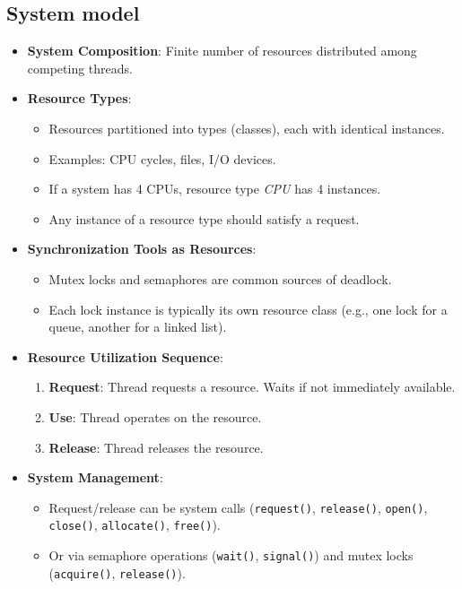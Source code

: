 \subsection{System model}
\begin{itemize}
    \item \textbf{System Composition}: Finite number of resources distributed among competing threads.
    \item \textbf{Resource Types}:
    \begin{itemize}
        \item Resources partitioned into types (classes), each with identical instances.
        \item Examples: CPU cycles, files, I/O devices.
        \item If a system has 4 CPUs, resource type \textit{CPU} has 4 instances.
        \item Any instance of a resource type should satisfy a request.
    \end{itemize}
    \item \textbf{Synchronization Tools as Resources}:
    \begin{itemize}
        \item Mutex locks and semaphores are common sources of deadlock.
        \item Each lock instance is typically its own resource class (e.g., one lock for a queue, another for a linked list).
    \end{itemize}
    \item \textbf{Resource Utilization Sequence}:
    \begin{enumerate}
        \item \textbf{Request}: Thread requests a resource. Waits if not immediately available.
        \item \textbf{Use}: Thread operates on the resource.
        \item \textbf{Release}: Thread releases the resource.
    \end{enumerate}
    \item \textbf{System Management}:
    \begin{itemize}
        \item Request/release can be system calls (\texttt{request()}, \texttt{release()}, \texttt{open()}, \texttt{close()}, \texttt{allocate()}, \texttt{free()}).
        \item Or via semaphore operations (\texttt{wait()}, \texttt{signal()}) and mutex locks (\texttt{acquire()}, \texttt{release()}).

\end{itemize}
\end{itemize}
